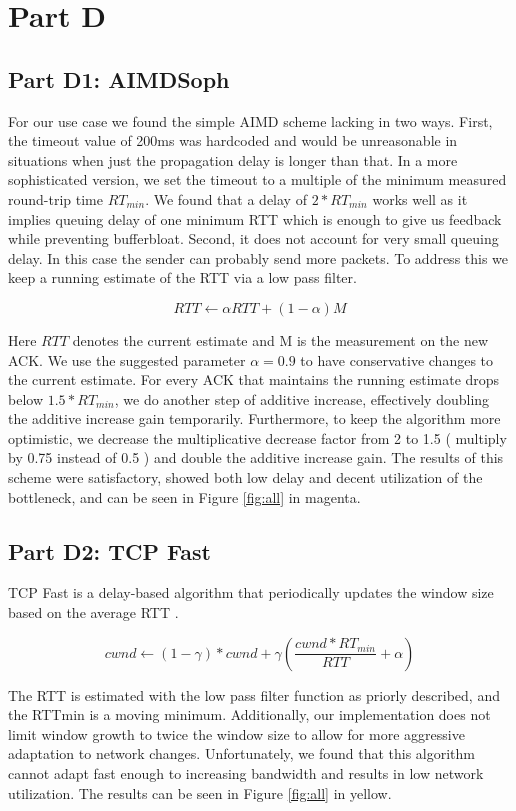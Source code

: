 \documentclass[12pt]{article}
\begin{document}
\section*{Part D}

\subsection*{Part D1: AIMDSoph}

For our use case we found the simple AIMD scheme lacking in two ways. First, the
timeout value of 200ms was hardcoded and would be unreasonable in situations
when just the propagation delay is longer than that. In a more sophisticated
version, we set the timeout to a multiple of the minimum measured round-trip
time $RT_{min}$. We found that a delay of $2*RT_{min}$ works well as it implies
queuing delay of one minimum RTT which is enough to give us feedback while
preventing bufferbloat. Second, it does not account for very small queuing
delay. In this case the sender can probably send more packets. To address this
we keep a running estimate of the RTT via a low pass filter. \cite{jacobson}

$${RTT} \leftarrow \alpha {RTT} + \left(1 - \alpha\right)M$$

Here ${RTT}$ denotes the current estimate and M is the measurement on the new
ACK. We use the suggested parameter $\alpha = 0.9$ to have conservative changes
to the current estimate. For every ACK that maintains the running estimate drops
below $1.5*RT_{min}$, we do another step of additive increase, effectively
doubling the additive increase gain temporarily. Furthermore, to keep the
algorithm more optimistic, we decrease the multiplicative decrease factor from 2
to 1.5 ( multiply by 0.75 instead of 0.5 ) and double the additive increase gain.
The results of this scheme were satisfactory, showed both low delay and decent
utilization of the bottleneck, and can be seen in Figure \ref{fig:all} in
magenta.

\subsection*{Part D2: TCP Fast}

TCP Fast is a delay-based algorithm that periodically updates the window size
based on the average RTT \cite{tcpfast}.

$$cwnd \leftarrow (1 - \gamma)* cwnd + \gamma \left(\frac{cwnd * {RT_{min}}}{RTT} + \alpha \right)$$

The RTT is estimated with the low pass filter function as priorly described, and
the RTTmin is a moving minimum. Additionally, our implementation does not limit
window growth to twice the window size to allow for more aggressive adaptation
to network changes. Unfortunately, we found that this algorithm cannot adapt fast
enough to increasing bandwidth and results in low network utilization. The results
can be seen in Figure \ref{fig:all} in yellow.
\end{document}
